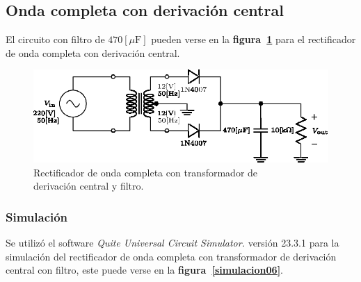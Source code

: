 \subsection{Onda completa con derivación central}
El circuito con filtro de $470[\mu\text{F}]$ pueden verse en la
\textbf{figura~\ref{circuito06}} para el rectificador de onda completa con
derivación central.

\begin{figure}[!h]
\centering
\includegraphics[scale=1.1]{diagramas/06.derivacion_central2.eps}
\caption{Rectificador de onda completa con transformador de \\
derivación central y filtro.}
\label{circuito06}
\end{figure}

\subsubsection{Simulación}
Se utilizó el software \emph{Quite Universal Circuit Simulator.} versión 23.3.1
para la simulación del rectificador de onda completa con transformador de
derivación central con filtro, este puede verse en la
\textbf{figura~\ref{simulacion06}}.

